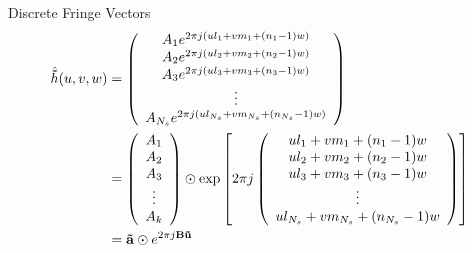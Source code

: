 \documentclass[ignorenonframetext]{beamer}
\begin{document}
\begin{frame}{Discrete Fringe Vectors}
 \begin{align}
  \hat{\mathbf{\vec{h}}}(u, v, w) &= \left( \begin{array}{c}
                A_1 e^{2 \pi j \left(u l_1 + v m_1 + (n_1-1) w \right)} \\
                A_2 e^{2 \pi j(u l_2 + v m_2 + (n_2-1) w )} \\
                A_3 e^{2 \pi j(u l_3 + v m_3 + (n_3-1) w )} \\
                 \vdots \\
                A_{N_s} e^{2 \pi j(u l_{N_s} + v m_{N_s} + (n_{N_s}-1) w )} \\
                \end{array} \right) \\
    &=\left( \begin{array}{c}
                 A_1\\
                 A_2 \\
                 A_3 \\
                 \vdots \\
                 A_k \end{array}  \right)  \odot \exp \left[ 2 \pi j \left( 
                    \begin{array}{c}
                 u l_1 + v m_1 + (n_1-1) w\\
                 u l_2 + v m_2 + (n_2-1) w \\
                 u l_3 + v m_3 + (n_3-1) w\\
                 \vdots \\
                 u l_{N_s} + v m_{N_s} + (n_{N_s}-1) w \\
                    \end{array}
                \right) \right] \nonumber \\
    &= \mathbf{\vec{a}} \odot e^{2 \pi j \mathbf{B}\mathbf{\vec{u}}}
    \label{eqn:fringe_vector}
\end{align}
\end{frame}
\end{document}

